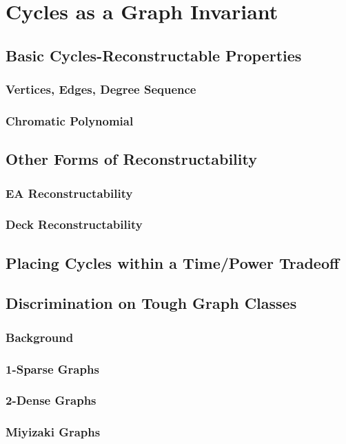 \documentclass[11pt,a4paper]{report}
\begin{document}
\chapter{Cycles as a Graph Invariant}

\section{Basic Cycles-Reconstructable Properties}
\subsection{Vertices, Edges, Degree Sequence}
\subsection{Chromatic Polynomial}

\section{Other Forms of Reconstructability}
\subsection{EA Reconstructability}
\subsection{Deck Reconstructability}

\section{Placing Cycles within a Time/Power Tradeoff}

\section{Discrimination  on Tough Graph Classes}
\subsection{Background}
\subsection{1-Sparse Graphs}
\subsection{2-Dense Graphs}
\subsection{Miyizaki Graphs}
\end{document}
